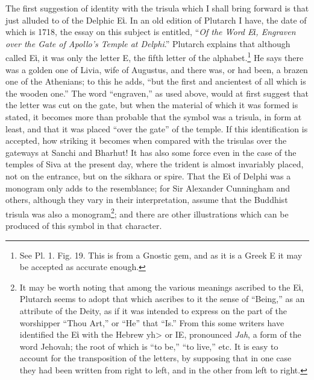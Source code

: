 \documentclass[a4paper, 11pt, oneside, english, landscape, twocolumn]{article}
\begin{document}
The first suggestion of identity with the trisula which I shall bring forward is that just alluded to of the Delphic Εὶ. In an old edition of Plutarch I have, the date of which is 1718, the essay on this subject is entitled, ``\emph{Of the Word Εὶ, Engraven over the Gate of Apollo's Temple at Delphi}.'' Plutarch explains that although called Εὶ, it was only the letter Ε, the fifth letter of the alphabet.\footnote{See Pl. 1. Fig. 19. This is from a Gnostic gem, and as it is a Greek Ε it may be accepted as accurate enough.} He says there was a golden one of Livia, wife of Augustus, and there was, or had been, a brazen one of the Athenians; to this he adds, ``but the first and ancientest of all which is the wooden one.'' The word ``engraven,'' as used above, would at first suggest that the letter was cut on the gate, but when the material of which it was formed is stated, it becomes more than probable that the symbol was a trisula, in form at least, and that it was placed ``over the gate'' of the temple. If this identification is accepted, how striking it becomes when compared with the trisulas over the gateways at Sanchi and Bharhut! It has also some force even in the case of the temples of Siva at the present day, where the trident is almost invariably placed, not on the entrance, but on the sikhara or spire. That the Εὶ of Delphi was a monogram only adds to the resemblance; for Sir Alexander Cunningham and others, although they vary in their interpretation, assume that the Buddhist trisula was also a monogram\footnote{It may be worth noting that among the various meanings ascribed to the Εὶ, Plutarch seems to adopt that which ascribes to it the sense of ``Being,'' as an attribute of the Deity, as if it was intended to express on the part of the worshipper ``Thou Art,'' or ``He'' that ``Is.'' From this some writers have identified the Εὶ with the Hebrew \<yh> or IE, pronounced \emph{Jah}, a form of the word Jehovah; the root of which is ``to be,'' ``to live,'' etc. It is easy to account for the transposition of the letters, by supposing that in one case they had been written from right to left, and in the other from left to right.}; and there are other illustrations which can be produced of this symbol in that character.
\end{document}
